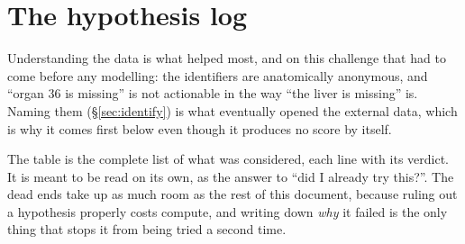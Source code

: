 \documentclass{article}
\begin{document}
\section{The hypothesis log}
\label{sec:log}

Understanding the data is what helped most, and on this challenge that had to come
before any modelling: the identifiers are anatomically anonymous, and ``organ 36
is missing'' is not actionable in the way ``the liver is missing'' is. Naming them
(\S\ref{sec:identify}) is what eventually opened the external data, which is why
it comes first below even though it produces no score by itself.

\vspace{2.0mm}

\noindent The table is the complete list of what was considered, each line with
its verdict. It is meant to be read on its own, as the answer to ``did I already
try this?''. The dead ends take up as much room as the rest of this document,
because ruling out a hypothesis properly costs compute, and writing down
\emph{why} it failed is the only thing that stops it from being tried a second
time.
\end{document}
